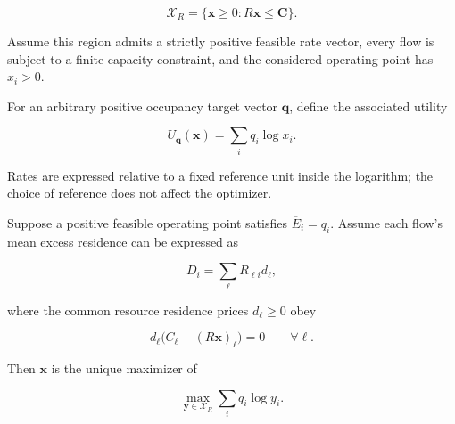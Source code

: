 \begin{equation}
\label{eq:app-a-10}
\mathcal X_R=
\{\mathbf x\ge0:R\mathbf x\le\mathbf C\}.
\end{equation}

Assume this region admits a strictly positive feasible rate vector, every flow is subject to a finite capacity constraint, and the considered operating point has \(x_i>0\).

For an arbitrary positive occupancy target vector \(\mathbf q\), define the associated utility

\begin{equation}
\label{eq:app-a-11}
U_{\mathbf q}(\mathbf x)
=\sum_iq_i\log x_i.
\end{equation}

Rates are expressed relative to a fixed reference unit inside the logarithm; the choice of reference does not affect the optimizer.

\begin{theorem}
\label{thm:a-1}
Suppose a positive feasible operating point satisfies \(\overline E_i=q_i\). Assume each flow's mean excess residence can be expressed as

\begin{equation}
\label{eq:app-a-12}
D_i=\sum_\ell R_{\ell i}d_\ell,
\end{equation}

where the common resource residence prices \(d_\ell\ge0\) obey

\begin{equation}
\label{eq:app-a-13}
d_\ell\big(C_\ell-(R\mathbf x)_\ell\big)=0
\qquad \forall\ell.
\end{equation}

Then \(\mathbf x\) is the unique maximizer of

\begin{equation}
\label{eq:app-a-14}
\boxed{
\max_{\mathbf y\in\mathcal X_R}
\sum_iq_i\log y_i.
}
\end{equation}
\end{theorem}


